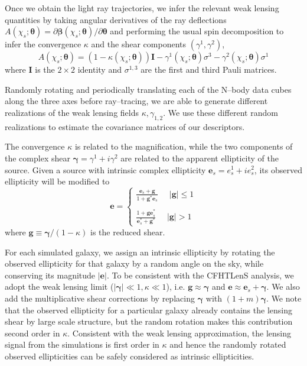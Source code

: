 \documentclass[reprint,aps,prd,superscriptaddress,showkeys,showpacs]{revtex4-1}
\begin{document}
Once we obtain the light ray trajectories, we infer the relevant weak
lensing quantities by taking angular derivatives of the ray
deflections $A(\chi_s;\pmb{\theta}) = \partial
\pmb{\beta}(\chi_s;\pmb{\theta})/\partial\pmb{\theta}$ and performing
the usual spin decomposition to infer the convergence $\kappa$ and the
shear components $(\gamma^1,\gamma^2)$,
%
%
\begin{equation}
A(\chi_s;\pmb{\theta}) = (1-\kappa(\chi_s;\pmb{\theta}))\pmb{I} - \gamma^1(\chi_s;\pmb{\theta})\sigma^3 - \gamma^2(\chi_s;\pmb{\theta})\sigma^1
\end{equation}  
%
where $\pmb{I}$ is the $2\times2$ identity and $\sigma^{1,3}$ are the
first and third Pauli matrices. 

Randomly rotating and periodically translating each of the N--body
data cubes along the three axes before ray--tracing, we are able to generate
different realizations of the weak lensing fields $\kappa,\gamma_{1,2}$. We use 
these different random realizations to estimate the covariance matrices of our
descriptors. 

The convergence $\kappa$ is related to
the magnification, while the two components of the complex shear
$\pmb{\gamma}=\gamma^1 + i\gamma^2$ are related to the apparent
ellipticity of the source. Given a source with intrinsic complex
ellipticity $\mathbf{e}_s=e^1_s + ie^2_s$, its observed ellipticity
will be modified to
%
\begin{equation}
\mathbf{e} = 
\begin{cases}
\frac{\mathbf{e}_s+\mathbf{g}}{1+\mathbf{g}^*\mathbf{e}_s} \,\,\,\,\,\,\,\, \vert \mathbf{g}\vert \leq 1 \\ \\
\frac{1+\mathbf{ge}_s^*}{\mathbf{e}_s^* + \mathbf{g}^*} \,\,\,\,\,\,\,\, \vert \mathbf{g}\vert > 1
\end{cases}
\end{equation}
%
where $\mathbf{g} \equiv \pmb{\gamma}/(1-\kappa)$ is the reduced shear. 

For each simulated galaxy, we assign an intrinsic ellipticity by
rotating the observed ellipticity for that galaxy by a random angle on
the sky, while conserving its magnitude $\vert\mathbf{e}\vert$. To be
consistent with the CFHTLenS analysis, we adopt the weak lensing limit
($\vert\pmb{\gamma}\vert\ll1,\kappa\ll1$), i.e.
$\mathbf{g}\approx\pmb{\gamma}$ and $\mathbf{e}\approx
\mathbf{e}_s+\pmb{\gamma}$. We also add the multiplicative shear
corrections by replacing $\pmb{\gamma}$ with $(1+m)\pmb{\gamma}$. We
note that the observed ellipticity for a particular galaxy already
contains the lensing shear by large scale structure, but the random
rotation makes this contribution second order in $\kappa$. Consistent
with the weak lensing approximation, the lensing signal from the
simulations is first order in $\kappa$ and hence the randomly rotated
observed ellipticities can be safely considered as intrinsic
ellipticities. 
\end{document}

